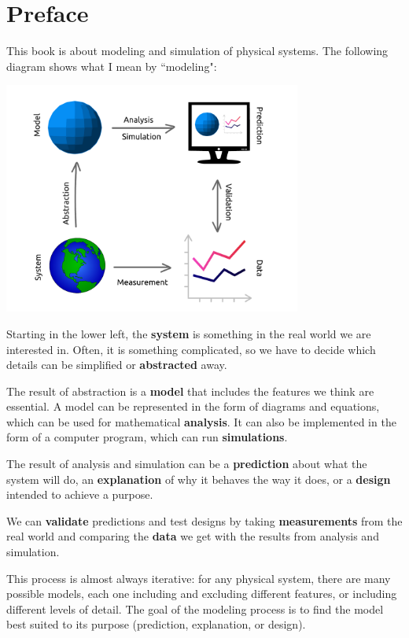 \documentclass[12pt]{book}
\theoremstyle{exercise}
\begin{document}
\fi

\chapter{Preface}
\label{preface}

This book is about modeling and simulation of physical systems.  
The following diagram shows what I mean by ``modeling":

\vspace{0.2in}
\centerline{\includegraphics[height=3in]{figs/modeling_framework.pdf}}

Starting in the lower left, the {\bf system} is something in the real world we are interested in.  Often, it is something complicated, so we have to decide which details can be simplified or {\bf abstracted} away.

The result of abstraction is a {\bf model} that includes the features we think are essential.  A model can be represented in the form of diagrams and equations, which can be used for mathematical {\bf analysis}.  It can also be implemented in the form of a computer program, which can run {\bf simulations}.

The result of analysis and simulation can be a {\bf prediction} about what the system will do, an {\bf explanation} of why it behaves the way it does, or a {\bf design} intended to achieve a purpose.

We can {\bf validate} predictions and test designs by taking {\bf measurements} from the real world and comparing the {\bf data} we get with the results from analysis and simulation. 

This process is almost always iterative: for any physical system, there are many possible models, each one including and excluding different features, or including different levels of detail.  The goal of the modeling process is to find the model best suited to its purpose (prediction, explanation, or design).
\end{document}
